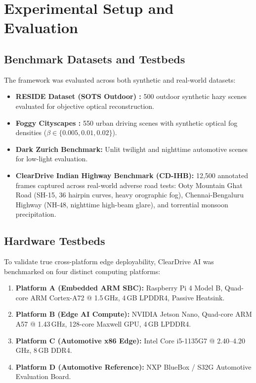 \documentclass[conference]{IEEEtran}
\begin{document}
\section{Experimental Setup and Evaluation}

\subsection{Benchmark Datasets and Testbeds}
The framework was evaluated across both synthetic and real-world datasets:
\begin{itemize}
    \item \textbf{RESIDE Dataset (SOTS Outdoor) \cite{li2018benchmarking}:} 500 outdoor synthetic hazy scenes evaluated for objective optical reconstruction.
    \item \textbf{Foggy Cityscapes \cite{sakaridis2018semantic}:} 550 urban driving scenes with synthetic optical fog densities ($\beta \in \{0.005, 0.01, 0.02\}$).
    \item \textbf{Dark Zurich Benchmark:} Unlit twilight and nighttime automotive scenes for low-light evaluation.
    \item \textbf{ClearDrive Indian Highway Benchmark (CD-IHB):} 12,500 annotated frames captured across real-world adverse road tests: Ooty Mountain Ghat Road (SH-15, 36 hairpin curves, heavy orographic fog), Chennai-Bengaluru Highway (NH-48, nighttime high-beam glare), and torrential monsoon precipitation.
\end{itemize}

\subsection{Hardware Testbeds}
To validate true cross-platform edge deployability, ClearDrive AI was benchmarked on four distinct computing platforms:
\begin{enumerate}
    \item \textbf{Platform A (Embedded ARM SBC):} Raspberry Pi 4 Model B, Quad-core ARM Cortex-A72 @ 1.5\,GHz, 4\,GB LPDDR4, Passive Heatsink.
    \item \textbf{Platform B (Edge AI Compute):} NVIDIA Jetson Nano, Quad-core ARM A57 @ 1.43\,GHz, 128-core Maxwell GPU, 4\,GB LPDDR4.
    \item \textbf{Platform C (Automotive x86 Edge):} Intel Core i5-1135G7 @ 2.40--4.20\,GHz, 8\,GB DDR4.
    \item \textbf{Platform D (Automotive Reference):} NXP BlueBox / S32G Automotive Evaluation Board.
\end{enumerate}
\end{document}
